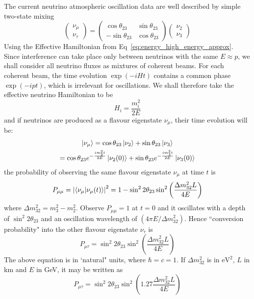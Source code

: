 The current neutrino atmospheric oscillation data are well described by simple two-state mixing
\begin{equation}
    \begin{pmatrix}\nu _\mu \\ \nu _\tau\end{pmatrix} = \begin{pmatrix}
        \cos \theta_{23} & \sin \theta_{23}\\
        -\sin \theta_{23} & \cos \theta_{23}
    \end{pmatrix}  \begin{pmatrix}
        \nu _2 \\ \nu _3
    \end{pmatrix}
\end{equation}
Using the Effective Hamiltonian from Eq~\ref{eq:energy_high_energy_approx}. Since interference can take place only between neutrinos with the same \(E \approx p\), we shall consider all neutrino fluxes as mixtures of coherent beams. For each coherent beam, the time evolution \(\exp (-iHt)\) contains a common phase \(\exp (-ipt)\), which is irrelevant for oscillations. We shall therefore take the effective neutrino Hamiltonian to be\cite{Dighe}
\begin{equation}
    H_i = \frac{m_i^2}{2E}
\end{equation}
and if neutrinos are produced as a flavour eigenstate \(\nu_\mu\), their time evolution will be:
\begin{equation}
    \begin{gathered}
    \ket{\nu _\mu} = \cos \theta_{23}\ket{\nu _2} + \sin \theta_{23}\ket{\nu _3}\\
     = \cos \theta_{23}e^{- \frac{im_2 ^2 t}{2E}}\ket{\nu _2(0)} + \sin \theta_{23}e^{- \frac{im_3 ^2 t}{2E}}\ket{\nu _3(0)}
    \end{gathered}
\end{equation}
the probability of observing the same flavour eigenstate \(\nu_\mu\) at time \(t\) is 
\begin{equation}
    P_{\mu\mu} = \abs{\braket{\nu_\mu}{\nu_\mu (t)}}^2 = 1 - \sin^2 2\theta_{23}\sin ^2 \left(\frac{\Delta m_{32}^2 L}{4E}\right)
\end{equation}
where \(\Delta m_{32}^2 = m_3 ^2 - m_{2} ^2\). Observe \(P_{\mu\mu} = 1\) at \(t = 0\) and it oscillates  with a depth of \(\sin ^2 2\theta_{23}\) and an oscillation wavelength of \((4\pi E/\Delta m_{32}^2)\).
Hence ``conversion probability" into the other flavour eigenstate \(\nu _\tau\) is 
\begin{equation}
    P_{\mu\tau} = \sin ^2 2 \theta_{23} \sin ^2 \left(\frac{\Delta m_{32}^2 L}{4E}\right)
\end{equation}
The above equation is in `natural" units, where  \(\hbar = c = 1\). If \(\Delta m^2 _{32}\) is in \(\mathrm{eV^2}\), \(L\) in km and \(E\) in GeV, it may be written as
\begin{equation}
    P_{\mu\tau} = \sin ^2 2 \theta_{23} \sin ^2 \left(1.27\frac{\Delta m_{32}^2 L}{4E}\right)
\end{equation}


